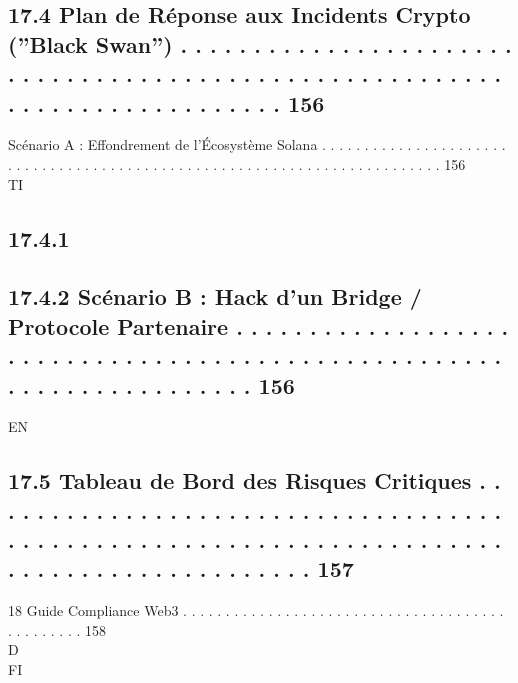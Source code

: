 \subsection{17.4    Plan de Réponse aux Incidents Crypto (”Black Swan”) . . . . . . . . . . . . . . . . . . . . . . . . . . . . . . . . . . . . . . . . . . . . . . . . . . . . . . . . . . . . . . . . . . . . . . . . . . . . 156}
Scénario A : Effondrement de l’Écosystème Solana . . . . . . . . . . . . . . . . . . . . . . . . . . . . . . . . . . . . . . . . . . . . . . . . . . . . . . . . . . . . . . . . . . . . . . . . . 156\\
\vspace{0.5em}
\vspace{0.5em}
\vspace{0.5em}
\vspace{0.5em}
TI\\
\subsection{17.4.1}
\subsection{17.4.2            Scénario B : Hack d’un Bridge / Protocole Partenaire . . . . . . . . . . . . . . . . . . . . . . . . . . . . . . . . . . . . . . . . . . . . . . . . . . . . . . . . . . . . . . . . . . . . . . 156}
\vspace{0.5em}
\vspace{0.5em}
\vspace{0.5em}
\vspace{0.5em}
EN\\
\subsection{17.5    Tableau de Bord des Risques Critiques . . . . . . . . . . . . . . . . . . . . . . . . . . . . . . . . . . . . . . . . . . . . . . . . . . . . . . . . . . . . . . . . . . . . . . . . . . . . . . . . . . . . . . . . . . . 157}
\vspace{0.5em}
18    Guide Compliance Web3 . . . . . . . . . . . . . . . . . . . . . . . . . . . . . . . . . . . . . . . . . . . . . . . 158\\
\vspace{0.5em}
\vspace{0.5em}
\vspace{0.5em}
\vspace{0.5em}
D\\
FI\\
